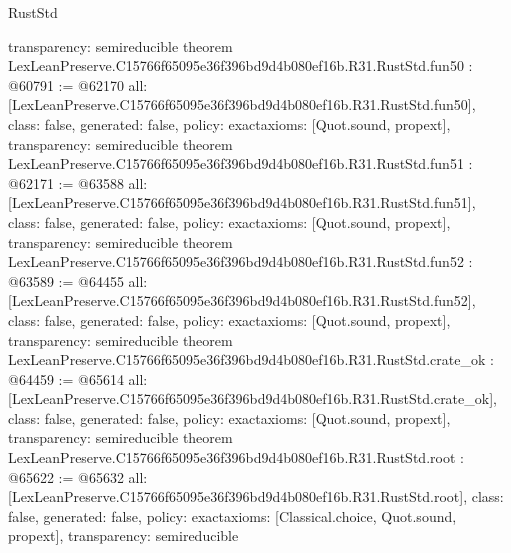 \begin{lexlean}{RustStd}
\begin{coremodule}
{  transparency: semireducible
}
theorem LexLeanPreserve.C15766f65095e36f396bd9d4b080ef16b.R31.RustStd.fun50 : @60791 := @62170 {
  all: [LexLeanPreserve.C15766f65095e36f396bd9d4b080ef16b.R31.RustStd.fun50],
  class: false,
  generated: false,
  policy: exact{axioms: [Quot.sound, propext]},
  transparency: semireducible
}
theorem LexLeanPreserve.C15766f65095e36f396bd9d4b080ef16b.R31.RustStd.fun51 : @62171 := @63588 {
  all: [LexLeanPreserve.C15766f65095e36f396bd9d4b080ef16b.R31.RustStd.fun51],
  class: false,
  generated: false,
  policy: exact{axioms: [Quot.sound, propext]},
  transparency: semireducible
}
theorem LexLeanPreserve.C15766f65095e36f396bd9d4b080ef16b.R31.RustStd.fun52 : @63589 := @64455 {
  all: [LexLeanPreserve.C15766f65095e36f396bd9d4b080ef16b.R31.RustStd.fun52],
  class: false,
  generated: false,
  policy: exact{axioms: [Quot.sound, propext]},
  transparency: semireducible
}
theorem LexLeanPreserve.C15766f65095e36f396bd9d4b080ef16b.R31.RustStd.crate_ok : @64459 := @65614 {
  all: [LexLeanPreserve.C15766f65095e36f396bd9d4b080ef16b.R31.RustStd.crate_ok],
  class: false,
  generated: false,
  policy: exact{axioms: [Quot.sound, propext]},
  transparency: semireducible
}
theorem LexLeanPreserve.C15766f65095e36f396bd9d4b080ef16b.R31.RustStd.root : @65622 := @65632 {
  all: [LexLeanPreserve.C15766f65095e36f396bd9d4b080ef16b.R31.RustStd.root],
  class: false,
  generated: false,
  policy: exact{axioms: [Classical.choice, Quot.sound, propext]},
  transparency: semireducible
}


\end{coremodule}
\end{lexlean}
